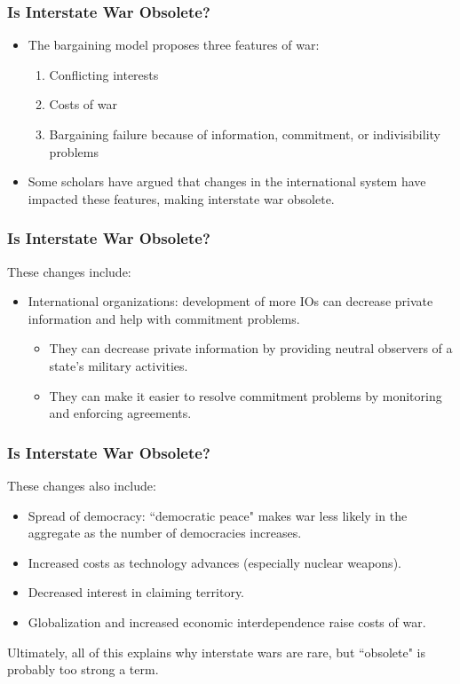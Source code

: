 \documentclass{beamer}
\begin{document}
\begin{frame} 
	\frametitle{\LARGE{Is Interstate War Obsolete?}}
	\begin{itemize}
		\item The bargaining model proposes three features of war: \pause 
		\begin{enumerate}
			\item Conflicting interests  
			\item Costs of war  
			\item Bargaining failure because of information, commitment, or indivisibility problems \pause
		\end{enumerate}
		\item Some scholars have argued that changes in the international system have impacted these features, making interstate war obsolete.
	\end{itemize}
\end{frame}

\begin{frame} 
	\frametitle{\LARGE{Is Interstate War Obsolete?}}
	These changes include:
	\begin{itemize}
		\item International organizations: development of more IOs can decrease private information and help with commitment problems. \pause
		\begin{itemize}
			\item They can decrease private information by providing neutral observers of a state’s military activities.
			\item They can make it easier to resolve commitment problems by monitoring and enforcing agreements.
		\end{itemize}
	\end{itemize}
\end{frame}

\begin{frame} 
	\frametitle{\LARGE{Is Interstate War Obsolete?}}
	These changes also include:
	\begin{itemize}
		\item Spread of democracy: ``democratic peace" makes war less likely in the aggregate as the number of democracies increases.
		\item Increased costs as technology advances (especially nuclear weapons). \pause
		\item Decreased interest in claiming territory. \pause
		\item Globalization and increased economic interdependence raise costs of war. \pause
	\end{itemize}
	Ultimately, all of this explains why interstate wars are rare, but ``obsolete" is probably too strong a term.
\end{frame}
\end{document}
